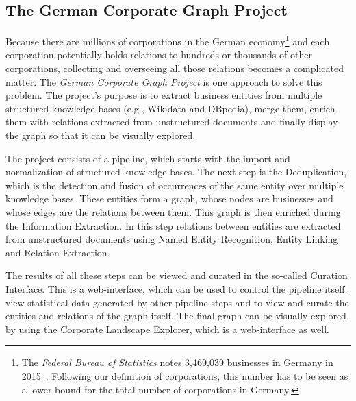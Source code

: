 \subsection*{The German Corporate Graph Project}
Because there are millions of corporations in the German economy\footnote{ The \emph{Federal Bureau of Statistics} notes 3,469,039 businesses in Germany in 2015\ \cite{destatis1}. Following our definition of corporations, this number has to be seen as a lower bound for the total number of corporations in Germany.} and each corporation potentially holds relations to hundreds or thousands of other corporations, collecting and overseeing all those relations becomes a complicated matter. The \emph{German Corporate Graph Project} is one approach to solve this problem. The project's purpose is to extract business entities from multiple structured knowledge bases (e.g., Wikidata and DBpedia), merge them, enrich them with relations extracted from unstructured documents and finally display the graph so that it can be visually explored.\par
The project consists of a pipeline, which starts with the import and normalization of structured knowledge bases. The next step is the Deduplication, which is the detection and fusion of occurrences of the same entity over multiple knowledge bases. These entities form a graph, whose nodes are businesses and whose edges are the relations between them. This graph is then enriched during the Information Extraction. In this step relations between entities are extracted from unstructured documents using Named Entity Recognition, Entity Linking and Relation Extraction.\par
The results of all these steps can be viewed and curated in the so-called Curation Interface. This is a web-interface, which can be used to control the pipeline itself, view statistical data generated by other pipeline steps and to view and curate the entities and relations of the graph itself. The final graph can be visually explored by using the Corporate Landscape Explorer, which is a web-interface as well.\par

